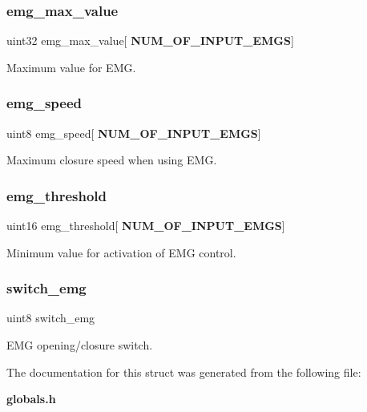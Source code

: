 \subsubsection{emg\+\_\+max\+\_\+value}
{\footnotesize\ttfamily uint32 emg\+\_\+max\+\_\+value[\textbf{ N\+U\+M\+\_\+\+O\+F\+\_\+\+I\+N\+P\+U\+T\+\_\+\+E\+M\+GS}]}

Maximum value for E\+MG. \mbox{\label{structst__emg_a66c08e905054b65a7e2a25a8780eb59b}} 
\subsubsection{emg\+\_\+speed}
{\footnotesize\ttfamily uint8 emg\+\_\+speed[\textbf{ N\+U\+M\+\_\+\+O\+F\+\_\+\+I\+N\+P\+U\+T\+\_\+\+E\+M\+GS}]}

Maximum closure speed when using E\+MG. \mbox{\label{structst__emg_aa406dc76b9d1c8741dc42db9ac4dab51}} 
\subsubsection{emg\+\_\+threshold}
{\footnotesize\ttfamily uint16 emg\+\_\+threshold[\textbf{ N\+U\+M\+\_\+\+O\+F\+\_\+\+I\+N\+P\+U\+T\+\_\+\+E\+M\+GS}]}

Minimum value for activation of E\+MG control. \mbox{\label{structst__emg_a90c7b59f97a26bf3da8b26b145b32919}} 
\subsubsection{switch\+\_\+emg}
{\footnotesize\ttfamily uint8 switch\+\_\+emg}

E\+MG opening/closure switch. 

The documentation for this struct was generated from the following file\+:\begin{DoxyCompactItemize}
\item 
\textbf{ globals.\+h}\end{DoxyCompactItemize}
